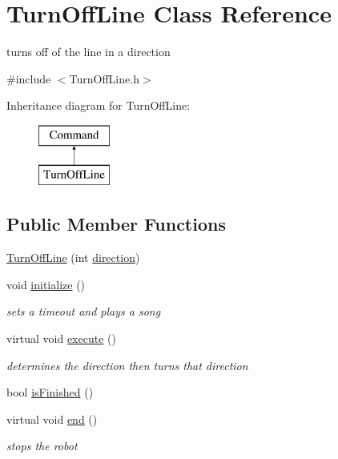 \hypertarget{classTurnOffLine}{\section{Turn\-Off\-Line Class Reference}
\label{classTurnOffLine}
}


turns off of the line in a direction  




{\ttfamily \#include $<$Turn\-Off\-Line.\-h$>$}

Inheritance diagram for Turn\-Off\-Line\-:\begin{figure}[H]
\begin{center}
\leavevmode
\includegraphics[height=2.000000cm]{classTurnOffLine}
\end{center}
\end{figure}
\subsection*{Public Member Functions}
\begin{DoxyCompactItemize}
\item 
\hyperlink{classTurnOffLine_a646faf11da687b4ed4330c6248b6e99e}{Turn\-Off\-Line} (int \hyperlink{classTurnOffLine_a7f229d3b3f2e9707b550affb60e7a71a}{direction})
\item 
void \hyperlink{classTurnOffLine_a4072817ff86f237d276a430e56e912a3}{initialize} ()
\begin{DoxyCompactList}\small\item\em sets a timeout and plays a song \end{DoxyCompactList}\item 
virtual void \hyperlink{classTurnOffLine_a9897de245832cd3ee74edc35b342fc03}{execute} ()
\begin{DoxyCompactList}\small\item\em determines the direction then turns that direction \end{DoxyCompactList}\item 
bool \hyperlink{classTurnOffLine_ad924499a6bc07a7331222e9b4aba3517}{is\-Finished} ()
\item 
virtual void \hyperlink{classTurnOffLine_ad888d865fb75e8139825f4dcf7709f1e}{end} ()
\begin{DoxyCompactList}\small\item\em stops the robot \end{DoxyCompactList}\end{DoxyCompactItemize}
